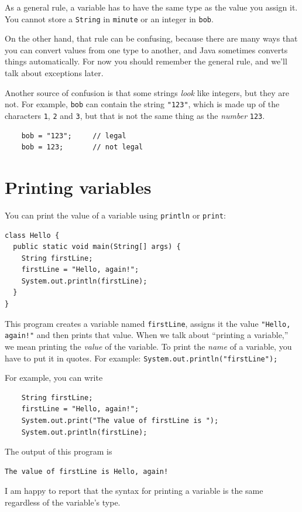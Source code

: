 As a general rule,
a variable has to have the same type as the
value you assign it.  You cannot store a {\tt String} in {\tt minute} or an
integer in {\tt bob}.

On the other hand, that rule can be confusing, because there are many
ways that you can convert values from one type to another, and Java
sometimes converts things automatically.  For now you should
remember the general rule, and we'll talk about exceptions later.

Another source of confusion is that some strings {\em look}
like integers, but they are not.  For example, {\tt bob}
can contain the string {\tt "123"}, which is made up of the
characters {\tt 1}, {\tt 2} and {\tt 3}, but that is not
the same thing as the {\em number} {\tt 123}.

\begin{lstlisting}
    bob = "123";     // legal
    bob = 123;       // not legal
\end{lstlisting}


\section{Printing variables}
\label{printing}

You can print the value of a variable using {\tt println} or
{\tt print}:

\begin{lstlisting}
class Hello {
  public static void main(String[] args) {
    String firstLine;
    firstLine = "Hello, again!";
    System.out.println(firstLine);
  }
}
\end{lstlisting}
%
This program creates a variable named {\tt firstLine}, assigns
it the value {\tt "Hello, again!"} and then prints that value.
When we talk about ``printing a variable,'' we mean printing
the {\em value} of the variable.  To print the {\em name} of
a variable, you have to put it in quotes.
For example: {\tt System.out.println("firstLine");}

For example, you can write

\begin{lstlisting}
    String firstLine;
    firstLine = "Hello, again!";
    System.out.print("The value of firstLine is ");
    System.out.println(firstLine);
\end{lstlisting}
%
The output of this program is

\begin{lstlisting}
The value of firstLine is Hello, again!
\end{lstlisting}
%
I am happy to report that the syntax for printing a variable
is the same regardless of the variable's type.

